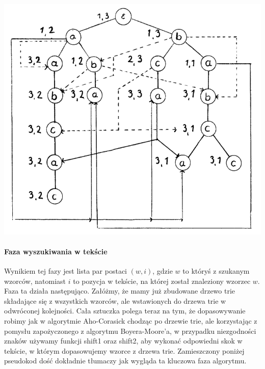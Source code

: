 \begin{center}
\includegraphics[scale=0.4]{graphics/trie-example-2.png}
\end{center}

\paragraph{Faza wyszukiwania w tekście}
Wynikiem tej fazy jest lista par postaci $(w, i)$, gdzie $w$ to któryś z szukanym wzorców, natomiast $i$ to pozycja w tekście, na której został znaleziony wzorzec $w$. Faza ta działa następująco. Załóżmy, że mamy już zbudowane drzewo trie składające się z wszystkich wzorców, ale wstawionych do drzewa trie w odwróconej kolejności. Cała sztuczka polega teraz na tym, że dopasowywanie robimy jak w algorytmie Aho-Corasick chodząc po drzewie trie, ale korzystając z pomysłu zapożyczonego z algorytmu Boyera-Moore'a, w przypadku niezgodności znaków używamy funkcji shift1 oraz shift2, aby wykonać odpowiedni skok w tekście, w którym dopasowujemy wzorce z drzewa trie. Zamieszczony poniżej pseudokod dość dokładnie tłumaczy jak wygląda ta kluczowa faza algorytmu.

